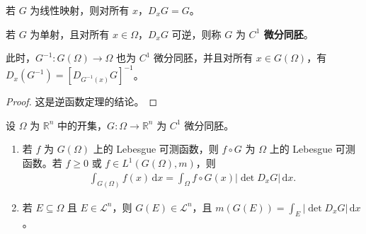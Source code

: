 \documentclass[../../main.tex]{subfiles}%
\begin{document}
\begin{remark}
若 $G$ 为线性映射，则对所有 $x$，$D_xG=G$。
\end{remark}
\begin{definition}[$C^1$ 微分同胚]\label{definition:ch02-c-one-diffeomorphism}
若 $G$ 为单射，且对所有 $x\in\Omega$，$D_xG$ 可逆，则称 $G$ 为 \textbf{$C^1$ 微分同胚}。
\end{definition}
\begin{proposition}\label{proposition:ch02-inverse-diffeomorphism}
此时，$G^{-1}:G(\Omega)\to\Omega$ 也为 $C^1$ 微分同胚，并且对所有 $x\in G(\Omega)$，有 $D_x(G^{-1})=[D_{G^{-1}(x)}G]^{-1}$。
\end{proposition}
\begin{proof}
这是逆函数定理的结论。
\end{proof}
\begin{theorem}\label{theorem:ch02-differentiable-change}
设 $\Omega$ 为 $\mathbb{R}^n$ 中的开集，$G:\Omega\to\mathbb{R}^n$ 为 $C^1$ 微分同胚。
\begin{enumerate}
\item\label{item:ch02-differentiable-change-integrals} 若 $f$ 为 $G(\Omega)$ 上的 Lebesgue 可测函数，则 $f\circ G$ 为 $\Omega$ 上的 Lebesgue 可测函数。若 $f\ge0$ 或 $f\in L^1(G(\Omega),m)$，则
\begin{align*}
\int_{G(\Omega)}f(x)\,\mathrm{d}x=\int_\Omega f\circ G(x)|\det D_xG|\,\mathrm{d}x.
\end{align*}
\item\label{item:ch02-differentiable-change-sets} 若 $E\subseteq\Omega$ 且 $E\in\mathscr{L}^n$，则 $G(E)\in\mathscr{L}^n$，且 $m(G(E))=\int_E|\det D_xG|\,\mathrm{d}x$。
\end{enumerate}
\end{theorem}
\end{document}
